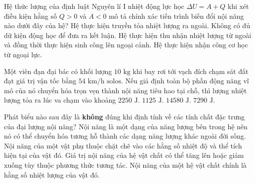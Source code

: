 \begin{ex}	Hệ thức lượng của định luật Nguyên lí I nhiệt động lực học $\Delta U = A + Q$ khi xét điều kiện hằng số $Q > 0$ và $A < 0$ mô tả chính xác tiến trình biến đổi nội năng nào dưới đây của hệ?
	\choice
	{Hệ thực hiện truyền tỏa nhiệt lượng ra ngoài.}
	{Không có đủ dữ kiện động học để đưa ra kết luận.}
	{\True Hệ thực hiện thu nhận nhiệt lượng từ ngoài và đồng thời thực hiện sinh công lên ngoại cảnh.}
	{Hệ thực hiện nhận công cơ học từ ngoại lực.}
\end{ex}

\begin{ex}	Một viên đạn đại bác có khối lượng $10\text{ kg}$ khi bay rơi tới vạch đích chạm sát đất đạt giá trị vận tốc bằng $54\text{ km/h solos}$. Nếu giả định toàn bộ phần động năng vĩ mô của nó chuyển hóa trọn vẹn thành nội năng tiêu hao tại chỗ, thì lượng nhiệt lượng tỏa ra lúc va chạm vào khoảng
	\choice
	{$2250\text{ J}$.}
	{\True $1125\text{ J}$.}
	{$14580\text{ J}$.}
	{$7290\text{ J}$.}
\end{ex}

\begin{ex}	Phát biểu nào sau đây là \textbf{không} đúng khi định tính về các tính chất đặc trưng của đại lượng nội năng?
	\choice
	{Nội năng là một dạng của năng lượng bên trong hệ nên nó có thể chuyển hóa tương hỗ thành các dạng năng lượng khác ngoài đời sống.}
	{Nội năng của một vật phụ thuộc chặt chẽ vào các hằng số nhiệt độ và thể tích hiện tại của vật đó.}
	{Giá trị nội năng của hệ vật chất có thể tăng lên hoặc giảm xuống tùy thuộc phương thức tương tác.}
	{\True Nội năng của một hệ vật chất chính là hằng số nhiệt lượng của vật đó.}
\end{ex}

